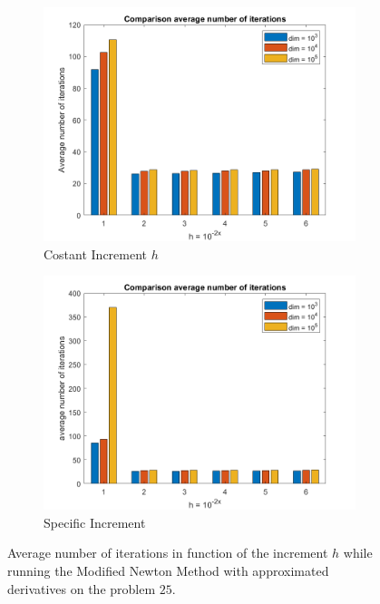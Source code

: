 \begin{figure}[htbp]
    \centering
    \begin{subfigure}[t]{0.45\textwidth}  %
        \centering
        \includegraphics[width=\textwidth]{img/pb25_MN_difffinite_COST_avgiterations.png}
        \caption{Costant Increment $h$}
    \end{subfigure}
    \hspace{1cm} %
    \begin{subfigure}[t]{0.45\textwidth}
        \centering
        \includegraphics[width=\textwidth]{img/pb25_MN_difffinite_REL_avgiterations.png}
        \caption{Specific Increment}
    \end{subfigure}
    \caption{ \small Average number of iterations in function of the increment $h$  while running the Modified Newton Method with approximated derivatives on the problem $25$.}
    \label{avgiterations25}
\end{figure}


